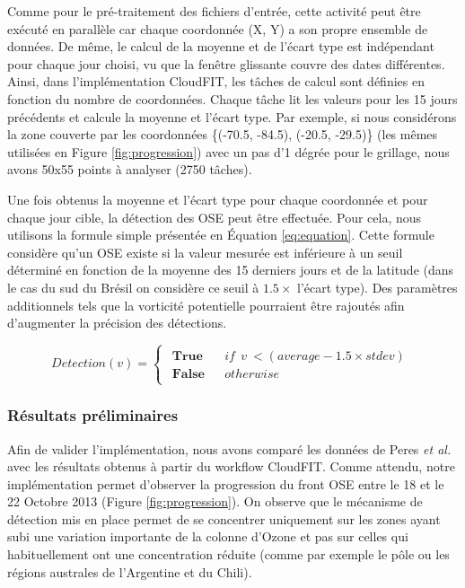 Comme pour le pré-traitement des fichiers d'entrée, cette activité peut être exécuté en parallèle car chaque coordonnée (X, Y) a son propre ensemble de données. De même, le calcul de la moyenne et de l'écart type est indépendant pour chaque jour choisi, vu que la fenêtre glissante couvre des dates différentes. Ainsi, dans l'implémentation CloudFIT, les tâches de calcul sont définies en fonction du nombre de coordonnées. Chaque tâche lit les valeurs pour les 15 jours précédents et calcule la moyenne et l'écart type. Par exemple, si nous considérons la zone couverte par les coordonnées \{(-70.5, -84.5), (-20.5, -29.5)\} (les mêmes utilisées en Figure \ref{fig:progression}) avec un pas d'1 dégrée pour le grillage, nous avons 50x55 points à analyser (2750 tâches). 

Une fois obtenus la moyenne et l'écart type pour chaque coordonnée et pour chaque jour cible, la détection des OSE peut être effectuée.  Pour cela, nous utilisons la formule simple présentée en Équation \ref{eq:equation}. Cette formule considère qu'un OSE existe si la valeur mesurée est inférieure à un seuil déterminé en fonction de la moyenne des 15 derniers jours et de la latitude (dans le cas du sud du Brésil on considère ce seuil à $1.5 \times$ l'écart type). Des paramètres additionnels tels que la vorticité potentielle pourraient être rajoutés afin d'augmenter la précision des détections.

\begin{equation}
Detection(v)=\left\{ \begin{array}{c}
\begin{array}{lll}
\textbf{True} & &if \:\: v \:< (average - 1.5\times stdev)\\
\textbf{False} & &otherwise\end{array}\end{array}\right.
\label{eq:equation}
\end{equation}



\subsubsection{Résultats préliminaires}

Afin de valider l'implémentation, nous avons comparé les données de Peres \textit{et al.} \cite{Peres2013} avec les résultats obtenus à partir du workflow CloudFIT. Comme attendu, notre implémentation permet d'observer la progression du front OSE entre le 18 et le 22 Octobre 2013 (Figure \ref{fig:progression}). On observe que le mécanisme de détection mis en place permet de se concentrer uniquement sur les zones ayant subi une variation importante de la colonne d'Ozone et pas sur celles qui habituellement ont une concentration réduite (comme par exemple le pôle ou les régions australes de l'Argentine et du Chili). 

